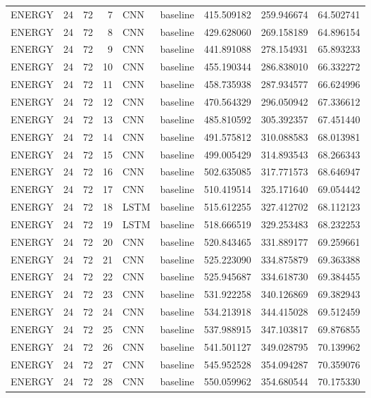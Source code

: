 \begin{table}
\begin{tabular}{lrrrllrrr}
ENERGY & 24 & 72 & 7 & CNN & baseline & 415.509182 & 259.946674 & 64.502741 \\
ENERGY & 24 & 72 & 8 & CNN & baseline & 429.628060 & 269.158189 & 64.896154 \\
ENERGY & 24 & 72 & 9 & CNN & baseline & 441.891088 & 278.154931 & 65.893233 \\
ENERGY & 24 & 72 & 10 & CNN & baseline & 455.190344 & 286.838010 & 66.332272 \\
ENERGY & 24 & 72 & 11 & CNN & baseline & 458.735938 & 287.934577 & 66.624996 \\
ENERGY & 24 & 72 & 12 & CNN & baseline & 470.564329 & 296.050942 & 67.336612 \\
ENERGY & 24 & 72 & 13 & CNN & baseline & 485.810592 & 305.392357 & 67.451440 \\
ENERGY & 24 & 72 & 14 & CNN & baseline & 491.575812 & 310.088583 & 68.013981 \\
ENERGY & 24 & 72 & 15 & CNN & baseline & 499.005429 & 314.893543 & 68.266343 \\
ENERGY & 24 & 72 & 16 & CNN & baseline & 502.635085 & 317.771573 & 68.646947 \\
ENERGY & 24 & 72 & 17 & CNN & baseline & 510.419514 & 325.171640 & 69.054442 \\
ENERGY & 24 & 72 & 18 & LSTM & baseline & 515.612255 & 327.412702 & 68.112123 \\
ENERGY & 24 & 72 & 19 & LSTM & baseline & 518.666519 & 329.253483 & 68.232253 \\
ENERGY & 24 & 72 & 20 & CNN & baseline & 520.843465 & 331.889177 & 69.259661 \\
ENERGY & 24 & 72 & 21 & CNN & baseline & 525.223090 & 334.875879 & 69.363388 \\
ENERGY & 24 & 72 & 22 & CNN & baseline & 525.945687 & 334.618730 & 69.384455 \\
ENERGY & 24 & 72 & 23 & CNN & baseline & 531.922258 & 340.126869 & 69.382943 \\
ENERGY & 24 & 72 & 24 & CNN & baseline & 534.213918 & 344.415028 & 69.512459 \\
ENERGY & 24 & 72 & 25 & CNN & baseline & 537.988915 & 347.103817 & 69.876855 \\
ENERGY & 24 & 72 & 26 & CNN & baseline & 541.501127 & 349.028795 & 70.139962 \\
ENERGY & 24 & 72 & 27 & CNN & baseline & 545.952528 & 354.094287 & 70.359076 \\
ENERGY & 24 & 72 & 28 & CNN & baseline & 550.059962 & 354.680544 & 70.175330 \\

\end{tabular}
\end{table}
